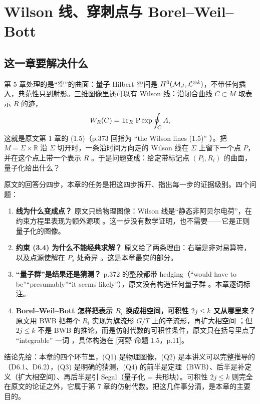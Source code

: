 \section{Wilson 线、穿刺点与 Borel--Weil--Bott}
\label{sec:wilson}

\subsection{这一章要解决什么}
\label{sec:ch6-intro}

第 5 章处理的是“空”的曲面：量子 Hilbert 空间是 $H^0(\mathcal{M}_J,\mathcal{L}^{\otimes k})$，不带任何插入，典范性只到射影。三维图像里还可以有 Wilson 线：沿闭合曲线 $C\subset M$ 取表示 $R$ 的迹，
\[
W_R(C)=\operatorname{Tr}_R\,\mathrm P\exp\oint_C A ,
\]
这就是原文第 1 章的 (1.5)（p.373 回指为 “the Wilson lines (1.5)” ）。把 $M=\Sigma\times\mathbb R$ 沿 $\Sigma$ 切开时，一条沿时间方向走的 Wilson 线在 $\Sigma$ 上留下一个点 $P$，并在这个点上带一个表示 $R$ 。于是问题变成：给定带标记点 $(P_i,R_i)$ 的曲面，量子化给出什么？

原文的回答分四步，本章的任务是把这四步拆开、指出每一步的证据级别。四个问题：

\begin{enumerate}[leftmargin=1.6em,itemsep=2pt]
\item[(Q1)] \textbf{线为什么变成点？} 原文只给物理图像：Wilson 线是“静态非阿贝尔电荷”，在约束方程里表现为额外源项 。这一步没有数学证明，也不需要——它是正则量子化的图像。
\item[(Q2)] \textbf{约束 (3.4) 为什么不能经典求解？} 原文给了两条理由：右端是非对易算符，以及点源使解在 $P_s$ 处奇异 。这是本章最实的部分。
\item[(Q3)] \textbf{“量子群”是结果还是猜测？} p.372 的整段都带 hedging（“would have to be”“presumably”“it seems likely”），原文没有构造任何量子群 。本章逐词标注。
\item[(Q4)] \textbf{Borel--Weil--Bott 怎样把表示 $R_i$ 换成相空间，可积性 $2j\le k$ 又从哪里来？} 原文用 BWB 把每个 $R_i$ 实现为旗流形 $G/T$ 上的辛流形，再扩大相空间 ；但 $2j\le k$ 不是 BWB 的推论，而是仿射代数的可积性条件，原文只在括号里点了 “integrable” 一词 ，具体构造在 [河野 命题 1.5，p.11]。
\end{enumerate}

结论先给：本章的四个环节里，(Q1) 是物理图像，(Q2) 是本讲义可以完整推导的（D6.1、D6.2），(Q3) 是明确的猜测，(Q4) 的前半是定理（BWB）、后半是补定义（扩大相空间）、再后半是引 Segal（量子化 = 共形块）。可积性 $2j\le k$ 则完全在原文的论证之外，它属于第 7 章的仿射代数。把这几件事分清，是本章的主要目的。

